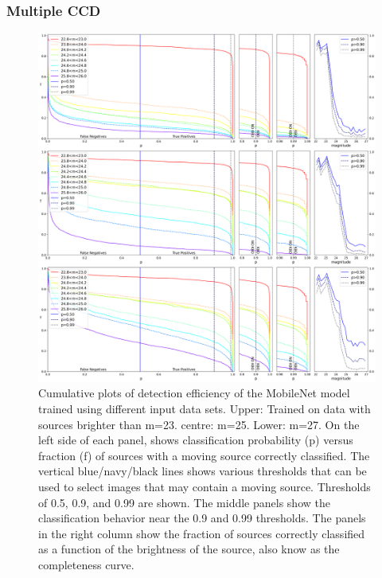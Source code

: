 \documentclass{aastex631}
\begin{document}
\subsubsection{Multiple CCD}
\label{subsubsect:MultipleChips}

\begin{figure}[ht]
\includegraphics[width=\textwidth,keepaspectratio]{Figures/completeness_positives.png} \caption{Cumulative plots of detection efficiency of the MobileNet model trained using different input data sets.
Upper: Trained on data with sources brighter than m=23. centre: m=25. Lower: m=27.
On the left side of each panel, shows classification probability (p) versus fraction (f) of sources with a moving source correctly classified. 
The vertical blue/navy/black lines shows various thresholds that can be used to select images that may contain a moving source.
Thresholds of 0.5, 0.9, and 0.99 are shown.
The middle panels show the classification behavior near the 0.9 and 0.99 thresholds.
The panels in the right column show the fraction of sources correctly classified as a function of the brightness of the source, also know as the completeness curve. \label{fig:completeness single}} 
\end{figure}
\end{document}
